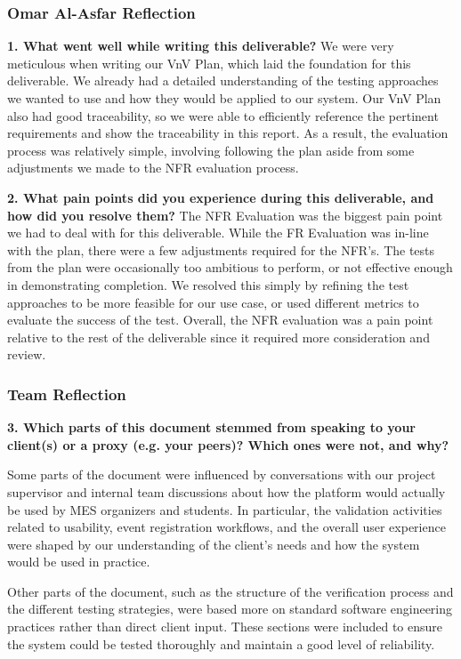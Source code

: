 \documentclass[12pt, titlepage]{article}
\begin{document}
\subsubsection*{Omar Al-Asfar Reflection}

\textbf{1. What went well while writing this deliverable?}
We were very meticulous when writing our VnV Plan, which laid the foundation for this deliverable. We already had a detailed understanding of the testing approaches we wanted to use and how they would be applied to our system. Our VnV Plan also had good traceability, so we were able to efficiently reference the pertinent requirements and show the traceability in this report. As a result, the evaluation process was relatively simple, involving following the plan aside from some adjustments we made to the NFR evaluation process.

\textbf{2. What pain points did you experience during this deliverable,
and how did you resolve them?}
The NFR Evaluation was the biggest pain point we had to deal with for this deliverable. While the FR Evaluation was in-line with the plan, there were a few adjustments required for the NFR's. The tests from the plan were occasionally too ambitious to perform, or not effective enough in demonstrating completion. We resolved this simply by refining the test approaches to be more feasible for our use case, or used different metrics to evaluate the success of the test. Overall, the NFR evaluation was a pain point relative to the rest of the deliverable since it required more consideration and review.

\subsubsection*{Team Reflection}

\textbf{3. Which parts of this document stemmed from speaking to your
client(s) or a proxy (e.g. your peers)? Which ones were not, and why?}

Some parts of the document were influenced by conversations with our
project supervisor and internal team discussions about how the platform
would actually be used by MES organizers and students. In particular, the
validation activities related to usability, event registration workflows,
and the overall user experience were shaped by our understanding of the
client’s needs and how the system would be used in practice.

Other parts of the document, such as the structure of the verification
process and the different testing strategies, were based more on standard
software engineering practices rather than direct client input. These
sections were included to ensure the system could be tested thoroughly
and maintain a good level of reliability.
\end{document}
